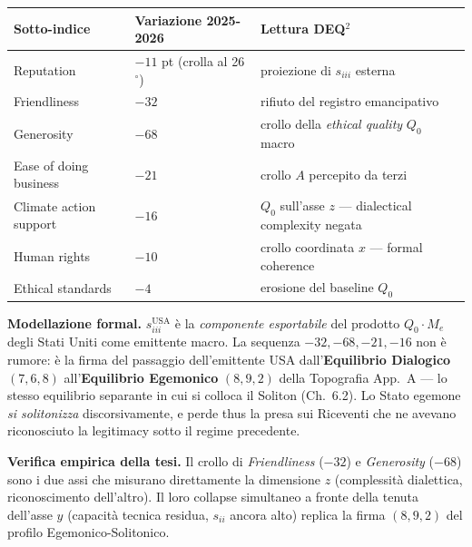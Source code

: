 {\def\LTcaptype{none} %
{\small\begin{longtable}[]{@{}
  >{\raggedright\arraybackslash}p{}
  >{\raggedright\arraybackslash}p{}
  >{\raggedright\arraybackslash}p{}@{}}
\toprule\noalign{}
\begin{minipage}[b]{\linewidth}\raggedright
Sotto-indice
\end{minipage} & \begin{minipage}[b]{\linewidth}\raggedright
Variazione 2025-2026
\end{minipage} & \begin{minipage}[b]{\linewidth}\raggedright
Lettura DEQ$^2$
\end{minipage} \\
\midrule\noalign{}
\endhead
\bottomrule\noalign{}
\endlastfoot
Reputation & \(-11\) pt (crolla al 26$^\circ$) & proiezione di \(s_{iii}\)
esterna \\
Friendliness & \(-32\) & rifiuto del registro emancipativo \\
Generosity & \(-68\) & crollo della \emph{ethical quality} \(Q_0\)
macro \\
Ease of doing business & \(-21\) & crollo \(A\) percepito da terzi \\
Climate action support & \(-16\) & \(Q_0\) sull'asse \(z\) ---
dialectical complexity negata \\
Human rights & \(-10\) & crollo coordinata \(x\) --- formal coherence \\
Ethical standards & \(-4\) & erosione del baseline \(Q_0\) \\
\end{longtable}}
}

\Hypoth{} \textbf{Modellazione formal.} \(s_{iii}^{\text{USA}}\) è la
\emph{componente esportabile} del prodotto \(Q_0 \cdot M_e\) degli Stati
Uniti come emittente macro. La sequenza \(-32, -68, -21, -16\) non è
rumore: è la firma del passaggio dell'emittente USA
dall'\textbf{Equilibrio Dialogico} \((7, 6, 8)\) all'\textbf{Equilibrio
Egemonico} \((8, 9, 2)\) della Topografia App.~A --- lo stesso
equilibrio separante in cui si colloca il Soliton (Ch.~6.2). Lo Stato
egemone \emph{si solitonizza} discorsivamente, e perde thus la presa sui
Riceventi che ne avevano riconosciuto la legitimacy sotto il regime
precedente.

\Proved{} \textbf{Verifica empirica della tesi.} Il crollo di
\emph{Friendliness} (\(-32\)) e \emph{Generosity} (\(-68\)) sono i due
assi che misurano direttamente la dimensione \(z\) (complessità
dialettica, riconoscimento dell'altro). Il loro collapse simultaneo a
fronte della tenuta dell'asse \(y\) (capacità tecnica residua,
\(s_{ii}\) ancora alto) replica la firma \((8, 9, 2)\) del profilo
Egemonico-Solitonico.



